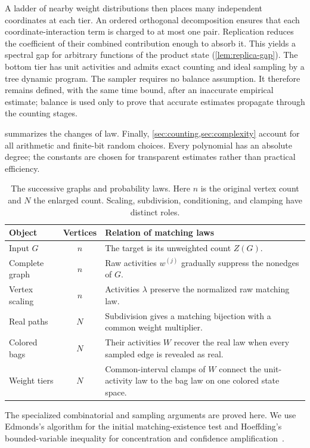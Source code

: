 \documentclass[11pt]{article}
\theoremstyle{definition}
\theoremstyle{remark}
\numberwithin{equation}{section}
\begin{document}
A ladder of nearby weight distributions then places many independent
coordinates at each tier. An ordered orthogonal decomposition ensures
that each coordinate-interaction term is charged to at most one pair.
Replication reduces the coefficient of their combined contribution
enough to absorb it. This yields a spectral gap for
arbitrary functions of the product state (\cref{lem:replica-gap}).
The bottom tier has unit activities and admits exact counting and
ideal sampling by a tree dynamic program. The sampler requires no
balance assumption. It therefore remains defined, with the same time
bound, after an inaccurate empirical estimate; balance is used only
to prove that accurate estimates propagate through the counting stages.

 summarizes the changes of law. Finally,
\cref{sec:counting,sec:complexity} account for all arithmetic and
finite-bit random choices. Every polynomial has an absolute degree;
the constants are chosen for transparent estimates rather than
practical efficiency.

\begin{table}[ht]
\centering
\small
\begin{tabular}{@{}p{}cp{}@{}}
\toprule
Object & Vertices & Relation of matching laws \\
\midrule
Input $G$ & $n$ & The target is its unweighted count $Z(G)$. \\
Complete graph & $n$ & Raw activities $w^{(j)}$ gradually suppress the nonedges of $G$. \\
Vertex scaling & $n$ & Activities $\lambda$ preserve the normalized raw matching law. \\
Real paths & $N$ & Subdivision gives a matching bijection with a common weight multiplier. \\
Colored bags & $N$ & Their activities $W$ recover the real law when every sampled edge is revealed as real. \\
Weight tiers & $N$ & Common-interval clamps of $W$ connect the unit-activity law to the bag law on one colored state space. \\
\bottomrule
\end{tabular}
\caption{The successive graphs and probability laws. Here $n$ is the
original vertex count and $N$ the enlarged count. Scaling, subdivision,
conditioning, and clamping have distinct roles.}
\label{tab:graph-laws}
\end{table}

The specialized combinatorial and sampling arguments are proved here.
We use Edmonds's algorithm for the initial matching-existence test
and Hoeffding's bounded-variable inequality for concentration and
confidence amplification~\cite{Edmonds1965,Hoeffding1963}.
\end{document}
